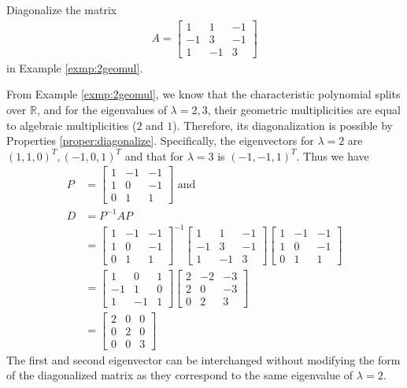 \begin{exmp}
Diagonalize the matrix 
\begin{align*}
A = \begin{bmatrix}
1 & 1 & -1 \\
-1 & 3 & -1 \\
1 & -1 & 3
\end{bmatrix}
\end{align*}
in Example \ref{exmp:2geomul}.
\end{exmp}
\begin{solution}
From Example \ref{exmp:2geomul}, we know that the characteristic polynomial splits over $\mathbb{R}$, and for the eigenvalues of $\lambda = 2,3$, their geometric multiplicities are equal to algebraic multiplicities ($2$ and $1$). Therefore, its diagonalization is possible by Properties \ref{proper:diagonalize}. Specifically, the eigenvectors for $\lambda = 2$ are $(1,1,0)^T, (-1,0,1)^T$ and that for $\lambda = 3$ is $(-1,-1,1)^T$. Thus we have
\begin{align*}
P &= 
\begin{bmatrix}
1 & -1 & -1 \\
1 & 0 & -1 \\
0 & 1 & 1
\end{bmatrix}
\text{ and} \\
D &= P^{-1}AP \\
&= \begin{bmatrix}
1 & -1 & -1 \\
1 & 0 & -1 \\
0 & 1 & 1
\end{bmatrix}^{-1}
\begin{bmatrix}
1 & 1 & -1 \\
-1 & 3 & -1 \\
1 & -1 & 3
\end{bmatrix}
 \begin{bmatrix}
1 & -1 & -1 \\
1 & 0 & -1 \\
0 & 1 & 1
\end{bmatrix} \\
&= 
\begin{bmatrix}
1 & 0 & 1 \\
-1 & 1 & 0 \\
1 & -1 & 1
\end{bmatrix}
\begin{bmatrix}
2 & -2 & -3 \\
2 & 0 & -3 \\
0 & 2 & 3
\end{bmatrix} \\
&= 
\begin{bmatrix}
2 & 0 & 0 \\
0 & 2 & 0 \\
0 & 0 & 3
\end{bmatrix}
\end{align*}
The first and second eigenvector can be interchanged without modifying the form of the diagonalized matrix as they correspond to the same eigenvalue of $\lambda = 2$.
\end{solution}

